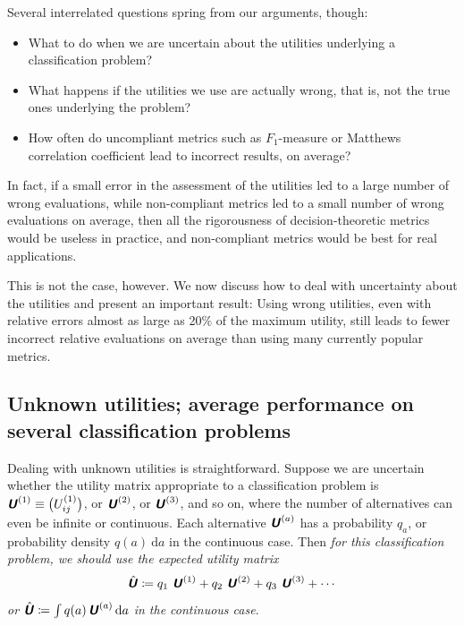 \documentclass[\ifafour a4paper,12pt,\else a5paper,10pt,\fi%
onecolumn,oneside,article,%
british%
]{memoir}
\theoremstyle{remark}
\theoremstyle{innote}
\newcommand*{\mathte}[1]{\textbf{\textit{\textsf{#1}}}}
\newcommand*{\di}{\mathrm{d}}%
\newcommand*{\defd}{\coloneqq}
\renewcommand*{\|}[1][]{\nonscript\:#1\vert\nonscript\:\mathopen{}}
\newcommand*{\myhat}[1]{{\mkern1.5mu\skew{2}\hat{\mkern-1.5mu#1\mkern-1.5mu}\mkern 1.5mu}}
\newcommand*{\aveu}{\myhat{\mathte{U}}}
\newcommand*{\uncu}[1]{\mathte{U}^{(#1)}}
\begin{document}
Several interrelated questions spring from our arguments, though:
\begin{itemize}
\item What to do when we are uncertain about the utilities underlying a classification problem?
\item What happens if the utilities we use are actually wrong, that is, not the true ones underlying the problem?
\item How often do uncompliant metrics such as $F_{1}$-measure or Matthews correlation coefficient lead to incorrect results, on average?
\end{itemize}
In fact, if a small error in the assessment of the utilities led to a large number of wrong evaluations, while non-compliant metrics led to a small number of wrong evaluations on average, then all the rigorousness of decision-theoretic metrics would be useless in practice, and  non-compliant metrics would be best for real applications.

This is not the case, however. We now discuss how to deal with uncertainty about the utilities and present an important result: Using wrong utilities, even with relative errors almost as large as 20\% of the maximum utility, still leads to fewer incorrect relative evaluations on average than using many currently popular metrics.

\subsection{Unknown utilities; average performance on several classification problems}
\label{sec:unknown_utilities}

Dealing with unknown utilities is straightforward. Suppose we are uncertain whether the utility matrix appropriate to a classification problem is $\uncu{1} \equiv \bigl(U^{(1)}_{ij}\bigr)$, or $\uncu{2}$, or $\uncu{3}$, and so on, where the number of alternatives can even be infinite or continuous. Each alternative $\uncu{a}$ has a probability $q_a$, or probability density $q(a)\ \di a$ in the continuous case. Then \emph{for this classification problem, we should use the expected utility matrix
  \begin{equation}
    \label{eq:expe_UM}
    \aveu \defd q_{1}\ \uncu{1} + q_{2}\ \uncu{2} + q_{3}\ \uncu{3} + \dotsb
  \end{equation}
  or $\aveu \defd \int q(a)\, \uncu{a}\, \di a$ in the continuous case}.
\end{document}
